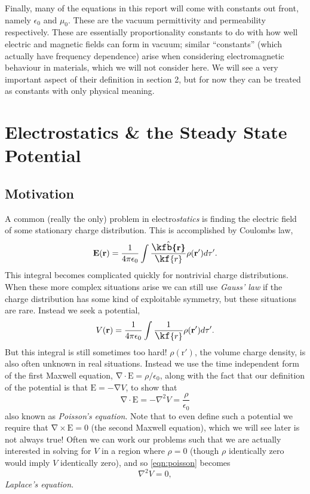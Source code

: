 \documentclass[10pt, twocolumn]{article}
\theoremstyle{definition}
\newcommand{\bv}[1]{\bm{\mathrm{#1}}}
\newcommand{\uv}[1]{\hat{\bv{{#1}}}}
\newcommand{\scriptr}{\fontsize{12pt}{12pt}\kf{r}\fontsize{10pt}{10pt}}
\newcommand{\bscriptr}{\fontsize{12pt}{12pt}\kfb{r}\fontsize{10pt}{10pt}}
\begin{document}
Finally, many of the equations in this report will come with constants out front, namely $\epsilon_0$ and $\mu_0$. These are the vacuum permittivity and
permeability respectively. These are essentially proportionality constants to do with how well electric and magnetic fields can form in vacuum; similar
``constants'' (which actually have frequency dependence) arise when considering electromagnetic behaviour in materials, which we will not consider here. We will
see a very important aspect of their definition in section 2, but for now they can be treated as constants with only physical meaning.
\section{Electrostatics \& the Steady State Potential}
\subsection{Motivation}
A common (really the only) problem in electro\emph{statics} is finding the electric field of some stationary charge distribution.
This is accomplished by Coulombs law,
\begin{equation}
  \bv{E}(\bv{r})=\frac{1}{4\pi\epsilon_0}\int \frac{\uv{\bscriptr}}{\scriptr} \rho(\bv{r}')d\tau'.
  \label{eqn:e-field-integral}
\end{equation}
This integral becomes complicated quickly for nontrivial charge distributions. When these more complex situations arise we can still use
\emph{Gauss' law} if the charge distribution has some kind of exploitable symmetry, but these situations are rare. Instead we seek a potential,
\begin{equation}
  V(\bv{r})=\frac{1}{4\pi\epsilon_0}\int\frac{1}{\scriptr}\rho(\bv{r}')d\tau'.
  \label{eqn:potential-integral}
\end{equation}
But this integral is still sometimes too hard! $\rho(\bv{r}')$, the volume charge density, is also often unknown in real situations.  Instead we use the time
independent form of the first Maxwell equation, $\bv{\nabla}\cdot \bv{E}=\rho/\epsilon_0$, along with the fact that our definition of the potential is that
$\bv{E}=-\bv{\nabla}V$, to show that
\begin{equation}
  \bv{\nabla}\cdot \bv{E}=-\nabla^2V=\frac{\rho}{\epsilon_0}
  \label{eqn:poisson}
\end{equation}
also known as \emph{Poisson's equation}. Note that to even define such a potential we require that $\bv{\nabla}\times\bv{E}=0$ (the second Maxwell equation),
which we will see later is not always true! Often we can work our problems such that we are actually interested in solving for $V$ in a region
where $\rho=0$ (though $\rho$ identically zero would imply $V$ identically zero), and so \cref{eqn:poisson} becomes
\begin{equation}
  \nabla^2 V=0,
  \label{eqn:laplace}
\end{equation}
\emph{Laplace's equation}.
\end{document}
